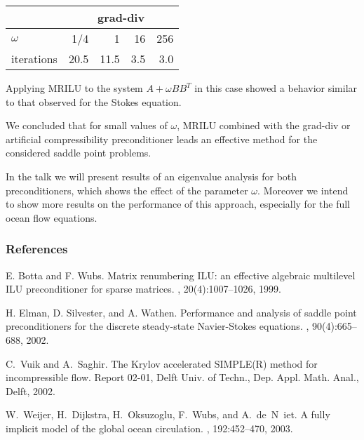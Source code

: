 \documentclass{report}
\begin{document}
\begin{center}
\begin{tabular}{l|rrrr|}
&\multicolumn{4}{|c}{\sc grad-div} \\
\hline
$\omega$ &1/4 &1 & 16 &256\\
iterations &20.5 &11.5 &3.5 &3.0\\
\hline
\end{tabular}
\end{center}
Applying {\sc MRILU} to the system $A+\omega BB^T$ in this case
showed a behavior similar to that observed for the Stokes
equation.

We concluded that for small values of $\omega$, MRILU combined
with the grad-div or artificial compressibility preconditioner
leads an effective method for the considered saddle point
problems.

In the talk we will present results of an eigenvalue analysis for
both preconditioners, which shows the effect of the parameter
$\omega$. Moreover we intend to show more results on the
performance of this approach, especially for the full ocean flow
equations.

\subsubsection*{References}
{\small

\noindent
[1] E. Botta and F. Wubs.
\newblock Matrix renumbering {I}{L}{U}: an effective algebraic multilevel
{I}{L}{U} preconditioner for sparse matrices.
, 20(4):1007--1026,
1999.

\noindent
[2] H. Elman, D. Silvester, and A. Wathen.
\newblock Performance and analysis of saddle point preconditioners for the
discrete steady-state {N}avier-{S}tokes equations.
, 90(4):665--688, 2002.

\noindent
[3] C.~Vuik and A.~Saghir.
\newblock The {K}rylov accelerated {SIMPLE(R)} method for incompressible flow.
\newblock Report 02-01, Delft Univ. of Techn., Dep. Appl. Math. Anal., Delft, 2002.

\noindent
[4] W.~Weijer, H.~Dijkstra, H.~Oksuzoglu, F.~Wubs, and
A.~de~N~iet.
\newblock A fully implicit model of the global ocean circulation.
, 192:452--470, 2003.
}
\end{document}
